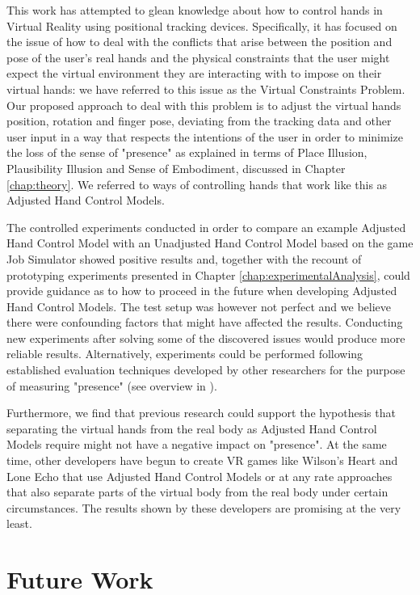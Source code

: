 This work has attempted to glean knowledge about how to control hands in Virtual Reality using positional tracking devices. Specifically, it has focused on the issue of how to deal with the conflicts that arise between the position and pose of the user's real hands and the physical constraints that the user might expect the virtual environment they are interacting with to impose on their virtual hands: we have referred to this issue as the Virtual Constraints Problem. Our proposed approach to deal with this problem is to adjust the virtual hands position, rotation and finger pose, deviating from the tracking data and other user input in a way that respects the intentions of the user in order to minimize the loss  of the sense of "presence" as explained in terms of Place Illusion, Plausibility Illusion and Sense of Embodiment, discussed in Chapter \ref{chap:theory}. We referred to ways of controlling hands that work like this as Adjusted Hand Control Models.

The controlled experiments conducted in order to compare an example Adjusted Hand Control Model with an Unadjusted Hand Control Model based on the game Job Simulator showed positive results and, together with the recount of prototyping experiments presented in Chapter \ref{chap:experimentalAnalysis}, could provide guidance as to how to proceed in the future when developing Adjusted Hand Control Models. The test setup was however not perfect and we believe there were confounding factors that might have affected the results. Conducting new experiments after solving some of the discovered issues would produce more reliable results. Alternatively, experiments could be performed following established evaluation techniques developed by other researchers for the purpose of measuring "presence" (see overview in \parencite{Schuemie2001}).

Furthermore, we find that previous research could support the hypothesis that separating the virtual hands from the real body as Adjusted Hand Control Models require might not have a negative impact on "presence". At the same time, other developers have begun to create VR games like Wilson's Heart and Lone Echo that use Adjusted Hand Control Models or at any rate approaches that also separate parts of the virtual body from the real body under certain circumstances. The results shown by these developers are promising at the very least.

\section{Future Work}
\label{sec:futureWork}

